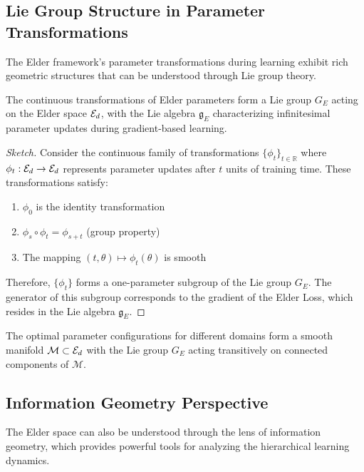 \subsection{Lie Group Structure in Parameter Transformations}

The Elder framework's parameter transformations during learning exhibit rich geometric structures that can be understood through Lie group theory.

\begin{theorem}
The continuous transformations of Elder parameters form a Lie group $G_E$ acting on the Elder space $\mathcal{E}_{d}$, with the Lie algebra $\mathfrak{g}_E$ characterizing infinitesimal parameter updates during gradient-based learning.
\end{theorem}

\begin{proof}[Sketch]
Consider the continuous family of transformations $\{\phi_t\}_{t \in \mathbb{R}}$ where $\phi_t: \mathcal{E}_{d} \rightarrow \mathcal{E}_{d}$ represents parameter updates after $t$ units of training time. These transformations satisfy:
\begin{enumerate}
\item $\phi_0$ is the identity transformation
\item $\phi_s \circ \phi_t = \phi_{s+t}$ (group property)
\item The mapping $(t, \theta) \mapsto \phi_t(\theta)$ is smooth
\end{enumerate}
Therefore, $\{\phi_t\}$ forms a one-parameter subgroup of the Lie group $G_E$. The generator of this subgroup corresponds to the gradient of the Elder Loss, which resides in the Lie algebra $\mathfrak{g}_E$.
\end{proof}

\begin{corollary}
The optimal parameter configurations for different domains form a smooth manifold $\mathcal{M} \subset \mathcal{E}_{d}$ with the Lie group $G_E$ acting transitively on connected components of $\mathcal{M}$.
\end{corollary}

\subsection{Information Geometry Perspective}

The Elder space can also be understood through the lens of information geometry, which provides powerful tools for analyzing the hierarchical learning dynamics.

